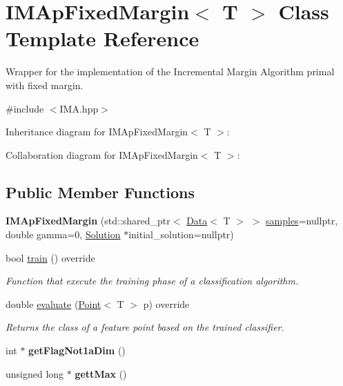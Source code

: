 \hypertarget{class_i_m_ap_fixed_margin}{}\section{I\+M\+Ap\+Fixed\+Margin$<$ T $>$ Class Template Reference}
\label{class_i_m_ap_fixed_margin}


Wrapper for the implementation of the Incremental Margin Algorithm primal with fixed margin.  




{\ttfamily \#include $<$I\+M\+A.\+hpp$>$}



Inheritance diagram for I\+M\+Ap\+Fixed\+Margin$<$ T $>$\+:


Collaboration diagram for I\+M\+Ap\+Fixed\+Margin$<$ T $>$\+:
\subsection*{Public Member Functions}
\begin{DoxyCompactItemize}
\item 
\mbox{\label{class_i_m_ap_fixed_margin_a90724da378b06629c891dea9fa49e379}} 
{\bfseries I\+M\+Ap\+Fixed\+Margin} (std\+::shared\+\_\+ptr$<$ \mbox{\hyperlink{class_data}{Data}}$<$ T $>$ $>$ \mbox{\hyperlink{class_classifier_a0000b47a2e0784ada4c52d7046c4adb8}{samples}}=nullptr, double gamma=0, \mbox{\hyperlink{class_solution}{Solution}} $\ast$initial\+\_\+solution=nullptr)
\item 
bool \mbox{\hyperlink{class_i_m_ap_fixed_margin_a4d99742be5fe5a21b8ae6f99547a98c8}{train}} () override
\begin{DoxyCompactList}\small\item\em Function that execute the training phase of a classification algorithm. \end{DoxyCompactList}\item 
double \mbox{\hyperlink{class_i_m_ap_fixed_margin_a909eb58c78c20780494598b478f8846f}{evaluate}} (\mbox{\hyperlink{class_point}{Point}}$<$ T $>$ p) override
\begin{DoxyCompactList}\small\item\em Returns the class of a feature point based on the trained classifier. \end{DoxyCompactList}\item 
\mbox{\label{class_i_m_ap_fixed_margin_ac928b3c55da2171adce3231223f85d42}} 
int $\ast$ {\bfseries get\+Flag\+Not1a\+Dim} ()
\item 
\mbox{\label{class_i_m_ap_fixed_margin_a90bd97bde25c511399400a85a5f786e2}} 
unsigned long $\ast$ {\bfseries gett\+Max} ()
\end{DoxyCompactItemize}

